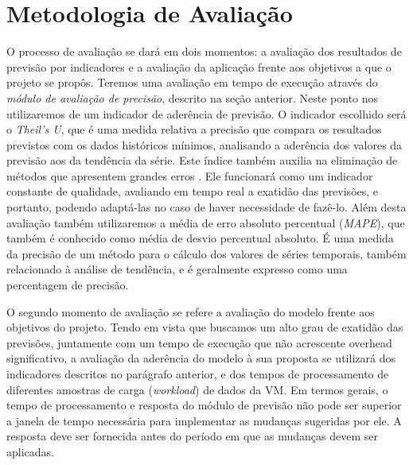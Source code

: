 \documentclass[twoside,english,brazilian]{UNISINOSmonografia}
\begin{document}
\section{Metodologia de Avaliação}
O processo de avaliação se dará em dois momentos: a avaliação dos resultados de previsão por indicadores e a avaliação da aplicação frente aos objetivos a que o projeto se propôs. Teremos uma avaliação em tempo de execução através do \textit{módulo de avaliação de precisão}, descrito na seção anterior. Neste ponto nos utilizaremos de um indicador de aderência de previsão. O indicador escolhido será o \textit{Theil's U}, que é uma medida relativa a precisão que compara os resultados previstos com os dados históricos mínimos, analisando a aderência dos valores da previsão aos da tendência da série. Este índice também auxilia na eliminação de métodos que apresentem grandes erros \cite{Shumway2000}. Ele funcionará como um indicador constante de qualidade, avaliando em tempo real a exatidão das previsões, e portanto, podendo adaptá-las no caso de haver necessidade de fazê-lo. Além desta avaliação também utilizaremos a média de erro absoluto percentual (\textit{MAPE}), que também é conhecido como média de desvio percentual absoluto. É uma medida da precisão de um método para o cálculo dos valores de séries temporais, também relacionado à análise de tendência, e é geralmente expresso como uma percentagem de precisão.

O segundo momento de avaliação se refere a avaliação do modelo frente aos objetivos do projeto. Tendo em vista que buscamos um alto grau de exatidão das previsões, juntamente com um tempo de execução que não acrescente overhead significativo, a avaliação da aderência do modelo à sua proposta se utilizará dos indicadores descritos no parágrafo anterior, e dos tempos de processamento de diferentes amostras de carga (\textit{workload}) de dados da VM. Em termos gerais, o tempo de processamento e resposta do módulo de previsão não pode ser superior a janela de tempo necessária para implementar as mudanças sugeridas por ele. A resposta deve ser fornecida antes do período em que as mudanças devem ser aplicadas.


\end{document}
